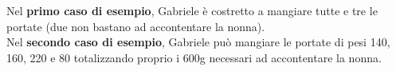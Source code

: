 \Examples
\begin{example}
%
\end{example}
\begin{example}
%
\end{example}


\Explanation
Nel \textbf{primo caso di esempio}, Gabriele è costretto a mangiare tutte e tre le portate (due non bastano ad accontentare la nonna).\\[2mm]
Nel \textbf{secondo caso di esempio}, Gabriele può mangiare le portate di pesi 140, 160, 220 e 80 totalizzando proprio i 600g necessari ad accontentare la nonna.
